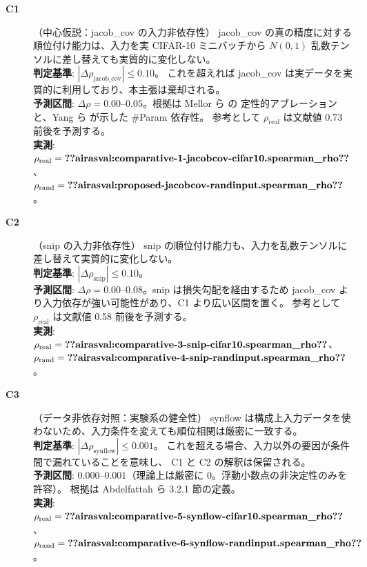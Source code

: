 \documentclass[11pt]{article}
\providecommand{\airasval}[1]{\textbf{??airasval:\detokenize{#1}??}}
\providecommand{\unverified}[1]{#1}
\begin{document}
\begin{description}

\item[\textbf{C1}]（中心仮説：jacob\_cov の入力非依存性）
jacob\_cov の真の精度に対する順位付け能力は、入力を実 CIFAR-10 ミニバッチから
$N(0,1)$ 乱数テンソルに差し替えても実質的に変化しない。\\
\textbf{判定基準}: $|\Delta\rho_{\mathrm{jacob\_cov}}| \le 0.10$。
これを超えれば jacob\_cov は実データを実質的に利用しており、本主張は棄却される。\\
\textbf{予測区間}: $\Delta\rho = 0.00$--$0.05$。根拠は Mellor ら \cite{mellor2021naswot} の
定性的アブレーションと、Yang ら \cite{yang2023revisiting} が示した \#Param 依存性。
参考として $\rho_{\mathrm{real}}$ は文献値 \unverified{0.73} 前後を予測する。\\
\textbf{実測}: $\rho_{\mathrm{real}} = \airasval{comparative-1-jacobcov-cifar10.spearman_rho}$、
$\rho_{\mathrm{rand}} = \airasval{proposed-jacobcov-randinput.spearman_rho}$。

\item[\textbf{C2}]（snip の入力非依存性）
snip の順位付け能力も、入力を乱数テンソルに差し替えて実質的に変化しない。\\
\textbf{判定基準}: $|\Delta\rho_{\mathrm{snip}}| \le 0.10$。\\
\textbf{予測区間}: $\Delta\rho = 0.00$--$0.08$。snip は損失勾配を経由するため
jacob\_cov より入力依存が強い可能性があり、C1 より広い区間を置く。
参考として $\rho_{\mathrm{real}}$ は文献値 \unverified{0.58} 前後を予測する。\\
\textbf{実測}: $\rho_{\mathrm{real}} = \airasval{comparative-3-snip-cifar10.spearman_rho}$、
$\rho_{\mathrm{rand}} = \airasval{comparative-4-snip-randinput.spearman_rho}$。

\item[\textbf{C3}]（データ非依存対照：実験系の健全性）
synflow は構成上入力データを使わないため、入力条件を変えても順位相関は厳密に一致する。\\
\textbf{判定基準}: $|\Delta\rho_{\mathrm{synflow}}| \le 0.001$。
これを超える場合、入力以外の要因が条件間で漏れていることを意味し、
C1 と C2 の解釈は保留される。\\
\textbf{予測区間}: $0.000$--$0.001$（理論上は厳密に $0$。浮動小数点の非決定性のみを許容）。
根拠は Abdelfattah ら \cite{abdelfattah2021zerocost} 3.2.1 節の定義。\\
\textbf{実測}: $\rho_{\mathrm{real}} = \airasval{comparative-5-synflow-cifar10.spearman_rho}$、
$\rho_{\mathrm{rand}} = \airasval{comparative-6-synflow-randinput.spearman_rho}$。


\end{description}
\end{document}
